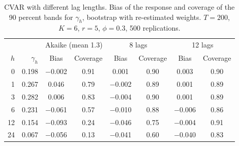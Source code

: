 \begin{table}[H]
\centering
\caption{CVAR with different lag lengths. Bias of the response and coverage of the 90 percent bands for $\gamma_h$, bootstrap with re-estimated weights. $T=200$, $K=6$, $r=5$, $\phi=0.3$, 500 replications.\label{tab:mc-lags}}
\begin{tabular}{rr cc cc cc}
\toprule
 & & \multicolumn{2}{c}{Akaike (mean 1.3)} & \multicolumn{2}{c}{8 lags} & \multicolumn{2}{c}{12 lags}\\
$h$ & $\gamma_h$ & Bias & Coverage & Bias & Coverage & Bias & Coverage\\
\midrule
0 & 0.198 & $-$0.002 & 0.91 & 0.001 & 0.90 & 0.003 & 0.90\\
1 & 0.267 & 0.046 & 0.79 & $-$0.002 & 0.89 & 0.001 & 0.89\\
3 & 0.282 & 0.006 & 0.83 & $-$0.004 & 0.90 & 0.001 & 0.89\\
6 & 0.231 & $-$0.061 & 0.57 & $-$0.010 & 0.88 & $-$0.006 & 0.86\\
12 & 0.154 & $-$0.093 & 0.24 & $-$0.046 & 0.75 & $-$0.004 & 0.91\\
24 & 0.067 & $-$0.056 & 0.13 & $-$0.041 & 0.60 & $-$0.040 & 0.83\\
\bottomrule
\end{tabular}
\end{table}
